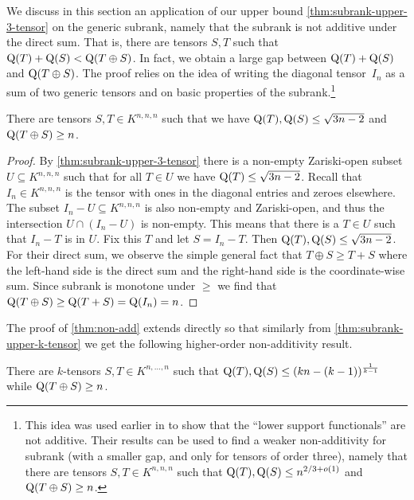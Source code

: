 \documentclass[10pt,a4paper]{article}
\theoremstyle{definition}
\theoremstyle{remark}
\newcommand{\subrank}{{\rm Q}}
\begin{document}
We discuss in this section an application of our upper bound \autoref{thm:subrank-upper-3-tensor} on the generic subrank, namely that the subrank is not additive under the direct sum. That is, there are tensors $S,T$ such that $\subrank(T) + \subrank(S) < \subrank(T \oplus S)$. In fact, we obtain a large gap between $\subrank(T) + \subrank(S)$ and $\subrank(T \oplus S)$. The proof relies on the idea of writing the diagonal tensor~$I_n$ as a sum of two generic tensors and on basic properties of the subrank.\footnote{This idea was used earlier in \cite{burg} to show that the ``lower support functionals'' \cite{strassen1991degeneration} are not additive. Their results can be used to find a weaker non-additivity for subrank (with a smaller gap, and only for tensors of order three), namely that there are tensors $S,T \in K^{n,n,n}$ such that $\subrank(T), \subrank(S) \leq n^{2/3 + o(1)}$ and $\subrank(T \oplus S) \geq n$.}

\begin{theorem}\label{thm:non-add}
There are tensors $S,T \in K^{n,n,n}$ such that we have $\subrank(T), \subrank(S) \leq \sqrt{3n-2}$ and $\subrank(T \oplus S) \geq n$.
\end{theorem}

\begin{proof}
By \autoref{thm:subrank-upper-3-tensor} there is a non-empty Zariski-open subset $U \subseteq K^{n,n,n}$ such that for all $T \in U$ we have $\subrank(T) \leq \sqrt{3n-2}$. Recall that $I_n \in K^{n,n,n}$ is the tensor with ones in the diagonal entries and zeroes elsewhere. The subset $I_n - U \subseteq K^{n,n,n}$ is also non-empty and Zariski-open, and thus the intersection $U \cap (I_n - U)$ is non-empty. This means that there is a $T \in U$ such that $I_n - T$ is in $U$. Fix this $T$ and let $S = I_n - T$. Then $\subrank(T), \subrank(S) \leq \sqrt{3n-2}$. For their direct sum, we observe the simple general fact that $T \oplus S \geq T + S$ where the left-hand side is the direct sum and the right-hand side is the coordinate-wise sum. Since subrank is monotone under $\geq$ we find that $\subrank(T \oplus S) \geq \subrank(T + S) = \subrank(I_n) = n$.
\end{proof}

The proof of \autoref{thm:non-add} extends directly so that similarly from \autoref{thm:subrank-upper-k-tensor} we get the following higher-order non-additivity result.

\begin{theorem}
There are $k$-tensors $S,T \in K^{n,\ldots,n}$ such that $\subrank(T), \subrank(S) \leq (kn-(k-1))^{\frac{1}{k-1}}$
while $\subrank(T \oplus S) \geq n$.
\end{theorem}
\end{document}
